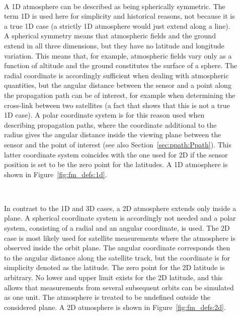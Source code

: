 \begin{description}
\item[\,\,\,] A 1D atmosphere can be described as being
  spherically symmetric. The term 1D is used here for simplicity and
  historical reasons, not because it is a true 1D case (a strictly 1D
  atmosphere would just extend along a line). A spherical symmetry
  means that atmospheric fields and the ground extend in all three
  dimensions, but they have no latitude and longitude variation. This
  means that, for example, atmospheric fields vary only as a function
  of altitude and the ground constitutes the surface of a sphere. The
  radial coordinate is accordingly sufficient when dealing with
  atmospheric quantities, but the angular distance between the sensor
  and a point along the propagation path can be of interest, for
  example when determining the cross-link between two satellites (a
  fact that shows that this is not a true 1D case). A polar coordinate
  system is for this reason used when describing propagation paths,
  where the coordinate additional to the radius gives the angular
  distance inside the viewing plane between the sensor and the point
  of interest (see also Section~\ref{sec:ppath:Ppath}). This latter
  coordinate system coincides with the one used for 2D if the sensor
  position is set to be the zero point for the latitudes. A 1D
  atmosphere is shown in Figure~\ref{fig:fm_defs:1d}.
  
\item[\,\,\,] In contrast to the 1D and 3D cases, a 2D
  atmosphere extends only inside a plane. A spherical coordinate
  system is accordingly not needed and a polar system, consisting of a radial and an angular
  coordinate, is used. The 2D case is most likely used for satellite
  measurements where the atmosphere is observed inside the orbit
  plane. The angular coordinate corresponds then to the angular
  distance along the satellite track, but the coordinate is for
  simplicity denoted as the latitude. The zero point for the 2D
  latitude is arbitrary. No lower and upper limit exists for the 2D
  latitude, and this allows that measurements from several subsequent
  orbits can be simulated as one unit. The atmosphere is treated to be
  undefined outside the considered plane. A 2D atmosphere is shown in
  Figure~\ref{fig:fm_defs:2d}.

\end{description}

